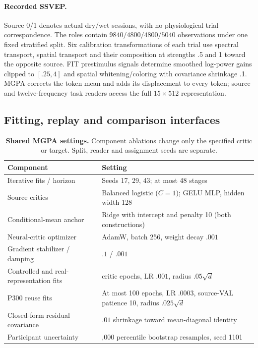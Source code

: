 \paragraph{Recorded SSVEP.}
Source 0/1 denotes actual dry/wet sessions, with no physiological trial
correspondence. The roles contain $9840/4800/4800/5040$ observations under
one fixed stratified split. Six calibration transformations of each trial
use spectral transport, spatial transport and their composition at strengths
.5 and 1 toward the opposite source. FIT prestimulus signals determine
smoothed log-power gains clipped to $[.25,4]$ and spatial whitening/coloring
with covariance shrinkage .1. MGPA corrects the token mean and adds its
displacement to every token; source and twelve-frequency task readers
access the full $15\times512$ representation.

\subsection{Fitting, replay and comparison interfaces}
\label{app:fitting-replay}
\label{app:component-fitting}
\begin{table}[htbp]
\centering\small
\caption{\textbf{Shared MGPA settings.} Component ablations change only the
specified critic or target. Split, reader and assignment seeds are separate.}
\label{tab:shared-settings}
\begin{tabular}{@{}>{\raggedright\arraybackslash}p{.34\linewidth}>{\raggedright\arraybackslash}p{.60\linewidth}@{}}
\toprule
Component & Setting \\
\midrule
Iterative fits / horizon & Seeds 17, 29, 43; at most 48 stages \\
Source critics & Balanced logistic ($C=1$); GELU MLP, hidden width 128 \\
Conditional-mean anchor & Ridge with intercept and penalty 10 (both constructions) \\
Neural-critic optimizer & AdamW, batch 256, weight decay $.001$ \\
Gradient stabilizer / damping & $.1$ / $.001$ \\
Controlled and real-representation fits & 12 critic epochs, LR $.001$, radius $.05\sqrt d$ \\
P300 reuse fits & At most 100 epochs, LR $.0003$, source-VAL patience 10,
radius $.025\sqrt d$ \\
Closed-form residual covariance & $.01$ shrinkage toward mean-diagonal identity \\
Participant uncertainty & 20,000 percentile bootstrap resamples, seed 1101 \\
\bottomrule
\end{tabular}
\end{table}

